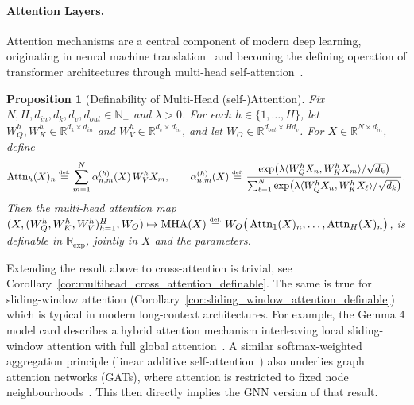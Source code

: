 \documentclass{article}
\newcommand{\eqdef}{\ensuremath{\stackrel{\mbox{\upshape\tiny def.}}{=}}}
\theoremstyle{plain}
\newtheorem{proposition}[theorem]{Proposition}
\newtheorem{corollary}[theorem]{Corollary}
\theoremstyle{definition}
\theoremstyle{remark}
\theoremstyle{plain}
\numberwithin{thm}{section}
\theoremstyle{definition}
\numberwithin{equation}{section}
\begin{document}
\paragraph{Attention Layers.}

Attention mechanisms are a central component of modern deep learning, originating in neural machine translation~\citep{bahdanau2015neural} and becoming the defining operation of transformer architectures through multi-head self-attention~\citep{vaswani2017attention}.

\begin{proposition}[Definability of Multi-Head (self-)Attention]
\label{prop:multihead_attention_definable}
Fix $N,H,d_{in},d_k,d_v,d_{out}\in\mathbb{N}_+$ and $\lambda>0$.  For each
$h\in\{1,\dots,H\}$, let
$W_Q^h,W_K^h\in\mathbb{R}^{d_k\times d_{in}}$ and
$W_V^h\in\mathbb{R}^{d_v\times d_{in}}$, and let
$W_O\in\mathbb{R}^{d_{out}\times Hd_v}$.
For $X\in\mathbb{R}^{N\times d_{in}}$, define
\[
    \operatorname{Attn}_h(X)_n
    \eqdef
        \sum_{m=1}^N
        \alpha^{(h)}_{n,m}(X)\,W_V^hX_m,
    \qquad
    \alpha^{(h)}_{n,m}(X)
    \eqdef
        \frac{
            \exp\!\big(
                \lambda\langle W_Q^hX_n,W_K^hX_m\rangle/\sqrt{d_k}
            \big)
        }{
            \sum_{\ell=1}^N
            \exp\!\big(
                \lambda\langle W_Q^hX_n,W_K^hX_\ell\rangle/\sqrt{d_k}
            \big)
        } .
\]
Then the multi-head attention map
$(X,(W_Q^h,W_K^h,W_V^h)_{h=1}^H,W_O)\mapsto \operatorname{MHA}(X)
\eqdef
W_O
\big(
\operatorname{Attn}_1(X)_n,\dots,
\operatorname{Attn}_H(X)_n
\big)$,
is definable in $\mathbb{R}_{\exp}$, jointly in $X$ and the parameters.
\end{proposition}

Extending the result above to cross-attention is trivial, see Corollary~\ref{cor:multihead_cross_attention_definable}. The same is true for sliding-window attention (Corollary~\ref{cor:sliding_window_attention_definable}) which is typical in modern long-context architectures. For example, the Gemma 4 model card describes a hybrid attention mechanism interleaving local sliding-window attention with full global attention~\citep{google2026gemma4modelcard}. A similar softmax-weighted aggregation principle (linear additive self-attention~\citep{saezdeocarizborde2024elucidating}) also underlies graph attention networks (GATs), where attention is restricted to fixed node neighbourhoods~\citep{velickovic2018graph}. This then directly implies the GNN version of that result.

\end{document}
